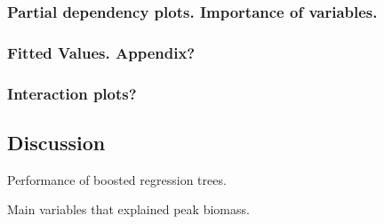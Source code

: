 \documentclass[
]{article}
\begin{document}
\hypertarget{partial-dependency-plots.-importance-of-variables.}{%
\subsubsection{Partial dependency plots. Importance of
variables.}\label{partial-dependency-plots.-importance-of-variables.}}

\hypertarget{fitted-values.-appendix}{%
\subsubsection{Fitted Values. Appendix?}\label{fitted-values.-appendix}}

\hypertarget{interaction-plots}{%
\subsubsection{Interaction plots?}\label{interaction-plots}}

\hypertarget{discussion}{%
\subsection{Discussion}\label{discussion}}

Performance of boosted regression trees.

Main variables that explained peak biomass.
\end{document}
